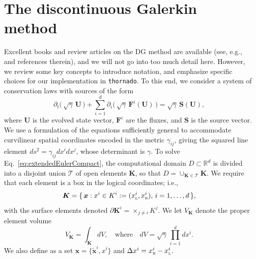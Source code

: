 \documentclass[letterpaper]{jpconf}
\newcommand{\vect}[1]{\boldsymbol{#1}}
\newcommand{\dx}{\Delta x}
\newcommand{\pd}[2]{\partial_{#2}{#1}}
\newcommand{\bx}{\vect{x}}
\newcommand{\bK}{\vect{K}}
\newcommand{\cT}{\mathcal{T}}
\newcommand{\xL}{x_{\textnormal{\tiny\textsc{L}}}}
\newcommand{\xH}{x_{\textnormal{\tiny\textsc{H}}}}
\newcommand{\thornado}{\texttt{thornado}}
\begin{document}
\section{The discontinuous Galerkin method}

Excellent books and review articles on the DG method are available (see, e.g., \cite{cockburnShu_1998,cockburnShu_2001,hesthavenWarburton_2008,shu_2016} and references therein), and we will not go into too much detail here.  
However, we review some key concepts to introduce notation, and emphasize specific choices for our implementation in \thornado.  
To this end, we consider a system of conservation laws with sources of the form
\begin{equation}
  \pd{}{t}\big(\,\sqrt{\gamma}\,\vect{U}\,\big)
  +\sum_{i=1}^{d}\pd{}{i}\Big(\,\sqrt{\gamma}\,\vect{F}^{i}(\vect{U})\,\Big)
  =\sqrt{\gamma}\,\vect{S}(\vect{U}),
  \label{eq:extendedEulerCompact}
\end{equation}
where $\vect{U}$ is the evolved state vector, $\vect{F}^{i}$ are the fluxes, and $\vect{S}$ is the source vector.  
We use a formulation of the equations sufficiently general to accommodate curvilinear spatial coordinates encoded in the metric $\gamma_{ij}$, giving the squared line element $ds^{2}=\gamma_{ij}dx^{i}dx^{j}$, whose determinant is $\gamma$.  
To solve Eq.~\eqref{eq:extendedEulerCompact}, the computational domain $D\subset\mathbb{R}^{d}$ is divided into a disjoint union $\cT$ of open elements $\bK$, so that $D = \cup_{\bK \in \cT}\bK$.  
We require that each element is a box in the logical coordinates; i.e.,
\begin{equation}
  \bK=\{\,\vect{x} : x^{i} \in K^{i} := (\xL^{i},\xH^{i}),\,i=1,\ldots,d\,\}, 
\end{equation}
with the surface elements denoted $\partial\bK^{i}=\times_{j\ne i}K^{j}$.  
We let $V_{\bK}$ denote the proper element volume
\begin{equation}
  V_{\bK} = \int_{\bK}dV, \quad\text{where}\quad dV = \sqrt{\gamma}\,\prod_{i=1}^{d}dx^{i}.  
\end{equation}
We also define as a set $\bx=\{\tilde{\bx}^{i},x^{i}\}$ and $\dx^{i}=\xH^{i}-\xL^{i}$.  
\end{document}
